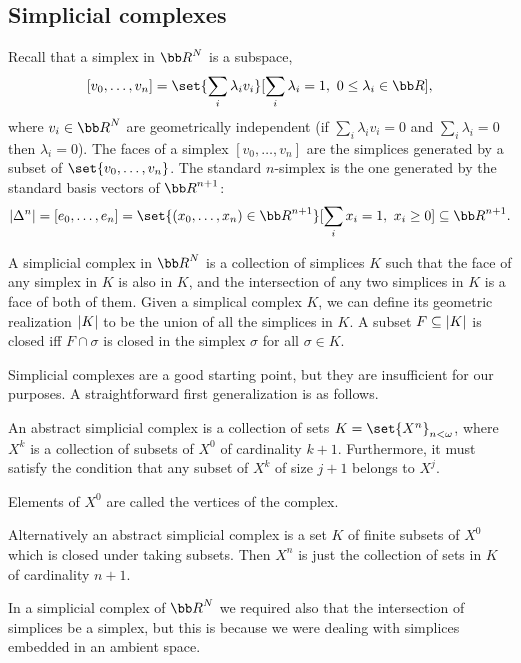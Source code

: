 \subsection{Simplicial complexes}

Recall that a {\emphcolor simplex} in $\bR^N$ is a subspace,
$$ [v_0,\dots,v_n] = \set{\sum_i\lambda_iv_i}[\sum_i\lambda_i=1,\ 0\leq\lambda_i\in\bR] , $$
where $v_i\in\bR^N$ are {\emphcolor geometrically independent} (if $\sum_i\lambda_iv_i=0$ and $\sum_i\lambda_i=0$ then $\lambda_i=0$).
The {\emphcolor faces} of a simplex $[v_0,\dots,v_n]$ are the simplices generated by a subset of $\set{v_0,\dots,v_n}$.
The {\emphcolor standard $n$-simplex} is the one generated by the standard basis vectors of $\bR^{n+1}$:
$$ \abs{\Delta^n} = [e_0,\dots,e_n] = \set{(x_0,\dots,x_n)\in\bR^{n+1}}[\sum_ix_i=1,\ x_i\geq0] \subseteq \bR^{n+1} . $$

A {\emphcolor simplicial complex} in $\bR^N$ is a collection of simplices $K$ such that the face of any simplex in $K$ is also in $K$, and the intersection of any two
simplices in $K$ is a face of both of them.
Given a simplical complex $K$, we can define its {\emphcolor geometric realization} $\mathopen{}\mathclose{\left|K\right|}$ to be the union of all the simplices in $K$.
A subset $F\subseteq\mathopen{}\mathclose{\left|K\right|}$ is closed iff $F\cap\sigma$ is closed in the simplex $\sigma$ for all $\sigma\in K$.

Simplicial complexes are a good starting point, but they are insufficient for our purposes.
A straightforward first generalization is as follows.

\bdefn[title={Abstract simplicial complexes}]

    An {\emphcolor abstract simplicial complex} is a collection of sets $K=\set{X^n}_{n<\omega}$, where $X^k$ is a collection of subsets of $X^0$
    of cardinality $k+1$.
    Furthermore, it must satisfy the condition that any subset of $X^k$ of size $j+1$ belongs to $X^j$.

    Elements of $X^0$ are called the {\emphcolor vertices} of the complex.

\edefn

Alternatively an abstract simplicial complex is a set $K$ of finite subsets of $X^0$ which is closed under taking subsets.
Then $X^n$ is just the collection of sets in $K$ of cardinality $n+1$.

In a simplicial complex of $\bR^N$ we required also that the intersection of simplices be a simplex, but this is because we were dealing with simplices
embedded in an ambient space.


